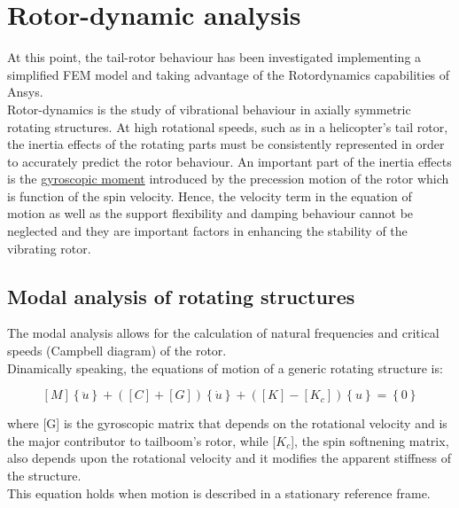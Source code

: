 \chapter{Rotor-dynamic analysis}


\noindent
At this point, the tail-rotor behaviour has been investigated implementing a simplified FEM model and taking advantage of the Rotordynamics capabilities of Ansys. \\
Rotor-dynamics is the study of vibrational behaviour in axially symmetric rotating structures. At high rotational speeds, such as in a helicopter's tail rotor, the inertia effects of the rotating parts must be consistently represented in order to accurately predict the rotor behaviour. An important part of the inertia effects is the \underline{gyroscopic moment} introduced by the precession motion of the rotor which is function of the spin velocity. Hence, the velocity term in the equation of motion as well as the support flexibility and damping behaviour cannot be neglected and they are important factors in enhancing the stability of the vibrating rotor.



\section*{Modal analysis of rotating structures}
\noindent
The modal analysis allows for the calculation of natural frequencies and critical speeds (Campbell diagram) of the rotor. \\
Dinamically speaking, the equations of motion of a generic rotating structure is:

\begin{equation*}
\left[ M \right] \left\lbrace \ddot{u} \right\rbrace + \left( \left[ C \right] + \left[ G \right] \right) \left\lbrace \dot{u} \right\rbrace + \left( \left[ K \right] - \left[ K_c \right] \right) \left\lbrace u \right\rbrace = \left\lbrace 0 \right\rbrace
\end{equation*}

\noindent
where [G] is the gyroscopic matrix that depends on the rotational velocity and is the major contributor to tailboom's rotor, while [$K_c$], the spin softnening matrix, also depends upon the rotational velocity and it modifies the apparent stiffness of the structure. \\
This equation holds when motion is described in a stationary reference frame.

